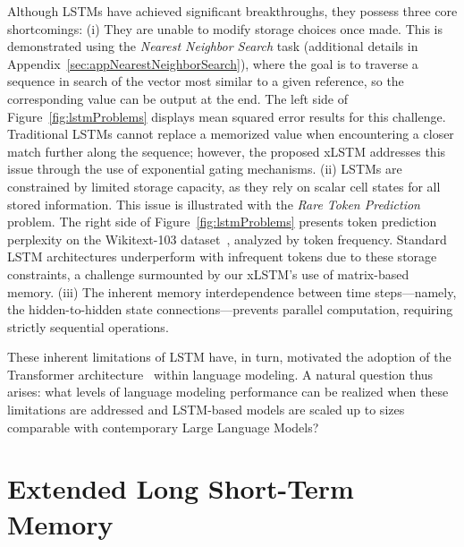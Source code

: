 Although LSTMs have achieved significant breakthroughs, they possess three core shortcomings: (i) They are unable to modify storage choices once made. This is demonstrated using the {\it Nearest Neighbor Search} task (additional details in Appendix~\ref{sec:appNearestNeighborSearch}), where the goal is to traverse a sequence in search of the vector most similar to a given reference, so the corresponding value can be output at the end. The left side of Figure~\ref{fig:lstmProblems} displays mean squared error results for this challenge. Traditional LSTMs cannot replace a memorized value when encountering a closer match further along the sequence; however, the proposed xLSTM addresses this issue through the use of exponential gating mechanisms. (ii) LSTMs are constrained by limited storage capacity, as they rely on scalar cell states for all stored information. This issue is illustrated with the {\it Rare Token Prediction} problem. The right side of Figure~\ref{fig:lstmProblems} presents token prediction perplexity on the Wikitext-103 dataset~\citep{Merity:17}, analyzed by token frequency. Standard LSTM architectures underperform with infrequent tokens due to these storage constraints, a challenge surmounted by our xLSTM’s use of matrix-based memory. (iii) The inherent memory interdependence between time steps—namely, the hidden-to-hidden state connections—prevents parallel computation, requiring strictly sequential operations.

These inherent limitations of LSTM have, in turn, motivated the adoption of the Transformer architecture~\citep{Vaswani:17} within language modeling. A natural question thus arises: what levels of language modeling performance can be realized when these limitations are addressed and LSTM-based models are scaled up to sizes comparable with contemporary Large Language Models?

\section{Extended Long Short-Term Memory}
\label{sec:xLSTM}

